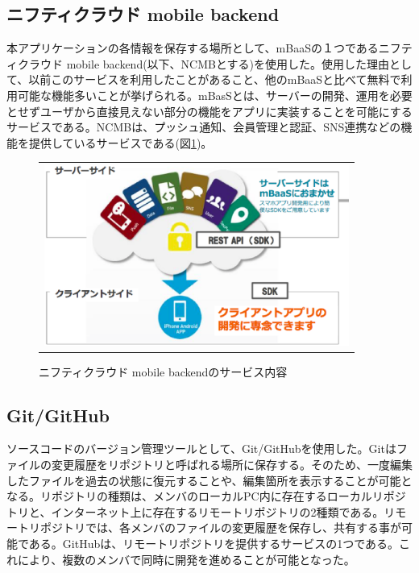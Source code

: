 \subsection{ニフティクラウド mobile backend}%
本アプリケーションの各情報を保存する場所として、mBaaSの１つであるニフティクラウド mobile backend(以下、NCMBとする)を使用した。使用した理由として、以前このサービスを利用したことがあること、他のmBaaSと比べて無料で利用可能な機能多いことが挙げられる。mBasSとは、サーバーの開発、運用を必要とせずユーザから直接見えない部分の機能をアプリに実装することを可能にするサービスである。NCMBは、プッシュ通知、会員管理と認証、SNS連携などの機能を提供しているサービスである(図\ref{fig:image_mbaas})。

\begin{figure}[htbp]
  \begin{center}
    \begin{tabular}{c}

      \begin{minipage}{0.7\hsize}
        \begin{center}
\includegraphics[width=10cm]{ncmb_overview.eps}
          \hspace{1cm} %
        \end{center}
      \end{minipage}

    \end{tabular}
    \caption{ニフティクラウド mobile backendのサービス内容}
    \label{fig:image_mbaas}
  \end{center}
\end{figure}


\subsection{Git/GitHub}%
ソースコードのバージョン管理ツールとして、Git/GitHubを使用した。Gitはファイルの変更履歴をリポジトリと呼ばれる場所に保存する。そのため、一度編集したファイルを過去の状態に復元することや、編集箇所を表示することが可能となる。リポジトリの種類は、メンバのローカルPC内に存在するローカルリポジトリと、インターネット上に存在するリモートリポジトリの2種類である。リモートリポジトリでは、各メンバのファイルの変更履歴を保存し、共有する事が可能である。GitHubは、リモートリポジトリを提供するサービスの1つである。これにより、複数のメンバで同時に開発を進めることが可能となった。


